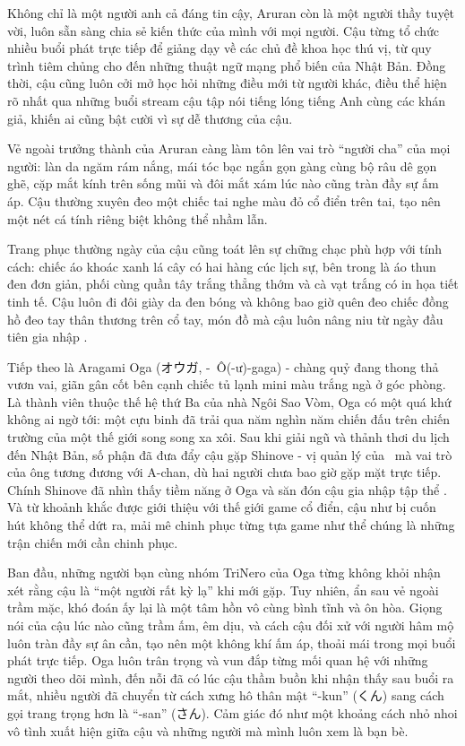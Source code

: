 \documentclass[../main.tex]{subfiles}
\begin{document}

Không chỉ là một người anh cả đáng tin cậy, Aruran còn là một người thầy tuyệt vời, luôn sẵn sàng chia sẻ kiến thức của mình với mọi người. Cậu từng tổ chức nhiều buổi phát trực tiếp để giảng dạy về các chủ đề khoa học thú vị, từ quy trình tiêm chủng cho đến những thuật ngữ mạng phổ biến của Nhật Bản. Đồng thời, cậu cũng luôn cởi mở học hỏi những điều mới từ người khác, điều thể hiện rõ nhất qua những buổi stream cậu tập nói tiếng lóng tiếng Anh cùng các khán giả, khiến ai cũng bật cười vì sự dễ thương của cậu.

Vẻ ngoài trưởng thành của Aruran càng làm tôn lên vai trò ``người cha'' của mọi người: làn da ngăm rám nắng, mái tóc bạc ngắn gọn gàng cùng bộ râu dê gọn ghẽ, cặp mắt kính trên sống mũi và đôi mắt xám lúc nào cũng tràn đầy sự ấm áp. Cậu thường xuyên đeo một chiếc tai nghe màu đỏ cổ điển trên tai, tạo nên một nét cá tính riêng biệt không thể nhầm lẫn.

Trang phục thường ngày của cậu cũng toát lên sự chững chạc phù hợp với tính cách: chiếc áo khoác xanh lá cây có hai hàng cúc lịch sự, bên trong là áo thun đen đơn giản, phối cùng quần tây trắng thẳng thớm và cà vạt trắng có in họa tiết tinh tế. Cậu luôn đi đôi giày da đen bóng và không bao giờ quên đeo chiếc đồng hồ đeo tay thân thương trên cổ tay, món đồ mà cậu luôn nâng niu từ ngày đầu tiên gia nhập \hls.

Tiếp theo là Aragami Oga (オウガ, -\ Ô(-ư)-gaga) - chàng quỷ đang thong thả vươn vai, giãn gân cốt bên cạnh chiếc tủ lạnh mini màu trắng ngà ở góc phòng. Là thành viên thuộc thế hệ thứ Ba của nhà Ngôi Sao Vòm, Oga có một quá khứ không ai ngờ tới: một cựu binh đã trải qua năm nghìn năm chiến đấu trên chiến trường của một thế giới song song xa xôi. Sau khi giải ngũ và thảnh thơi du lịch đến Nhật Bản, số phận đã đưa đẩy cậu gặp Shinove - vị quản lý của \hls\ mà vai trò của ông tương đương với A-chan, dù hai người chưa bao giờ gặp mặt trực tiếp. Chính Shinove đã nhìn thấy tiềm năng ở Oga và săn đón cậu gia nhập tập thể \hls. Và từ khoảnh khắc được giới thiệu với thế giới game cổ điển, cậu như bị cuốn hút không thể dứt ra, mải mê chinh phục từng tựa game như thể chúng là những trận chiến mới cần chinh phục.

Ban đầu, những người bạn cùng nhóm TriNero của Oga từng không khỏi nhận xét rằng cậu là ``một người rất kỳ lạ'' khi mới gặp. Tuy nhiên, ẩn sau vẻ ngoài trầm mặc, khó đoán ấy lại là một tâm hồn vô cùng bình tĩnh và ôn hòa. Giọng nói của cậu lúc nào cũng trầm ấm, êm dịu, và cách cậu đối xử với người hâm mộ luôn tràn đầy sự ân cần, tạo nên một không khí ấm áp, thoải mái trong mọi buổi phát trực tiếp. Oga luôn trân trọng và vun đắp từng mối quan hệ với những người theo dõi mình, đến nỗi đã có lúc cậu thầm buồn khi nhận thấy sau buổi ra mắt, nhiều người đã chuyển từ cách xưng hô thân mật ``-kun'' (くん) sang cách gọi trang trọng hơn là ``-san'' (さん). Cảm giác đó như một khoảng cách nhỏ nhoi vô tình xuất hiện giữa cậu và những người mà mình luôn xem là bạn bè.
\end{document}

